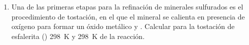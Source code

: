 \documentclass[10pt,a4paper]{article}
\newcommand{\rta}{\underline{\textbf{Respuesta:}} }
\begin{document}
\begin{enumerate}
	\rta \si{\gram{}} = \SI{1,63}{\gram{}} - \SI{1,12}{\gram{}} = \SI{0.51}{\gram{}}
	\begin{align*}
	\frac{\SI{1,12}{\gram\of{Cr}}}{\SI{51.99}{\gram\of{Cr}}} = \num{0.021} &\quad \frac{\SI{0.51}{\gram\of{O}}}{\SI{16.0}{\gram\of{O}}} = \num{0.032}\\
	\frac{\num{0.021}}{\num{0.021}} = 1 &\quad \frac{\num{0.032}}{\num{0.021}} \approx \num{1.5}
	\end{align*}
	
	Si multiplico por 2 para obtener n\'umeros enteros, entonces la f\'ormula es: 
	
	\item  Una de las primeras etapas para la refinación de minerales sulfurados es el procedimiento de
	tostación, en el que el mineral se calienta en presencia de oxígeno para formar un óxido
	metálico y . Calcular para la tostación de esfalerita ()  \SI{298}{\kelvin} y  \SI{298}{\kelvin} de la reacción.
	

		
\end{enumerate}
\end{document}
